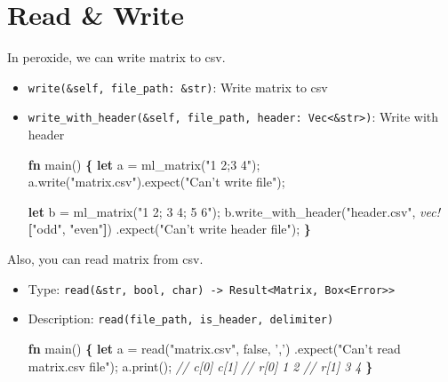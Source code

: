 \documentclass[]{book}
\newenvironment{Shaded}{\begin{snugshade}}{\end{snugshade}}
\newcommand{\CharTok}[1]{\textcolor[rgb]{0.31,0.60,0.02}{#1}}
\newcommand{\CommentTok}[1]{\textcolor[rgb]{0.56,0.35,0.01}{\textit{#1}}}
\newcommand{\ConstantTok}[1]{\textcolor[rgb]{0.00,0.00,0.00}{#1}}
\newcommand{\KeywordTok}[1]{\textcolor[rgb]{0.13,0.29,0.53}{\textbf{#1}}}
\newcommand{\NormalTok}[1]{#1}
\newcommand{\OperatorTok}[1]{\textcolor[rgb]{0.81,0.36,0.00}{\textbf{#1}}}
\newcommand{\PreprocessorTok}[1]{\textcolor[rgb]{0.56,0.35,0.01}{\textit{#1}}}
\newcommand{\StringTok}[1]{\textcolor[rgb]{0.31,0.60,0.02}{#1}}
\begin{document}
\hypertarget{read-write}{%
\section{Read \& Write}\label{read-write}}

In peroxide, we can write matrix to csv.

\begin{itemize}
\item
  \texttt{write(\&self,\ file\_path:\ \&str)}: Write matrix to csv
\item
  \texttt{write\_with\_header(\&self,\ file\_path,\ header:\ Vec\textless{}\&str\textgreater{})}: Write with header

\begin{Shaded}
\begin{Highlighting}[]
\KeywordTok{fn}\NormalTok{ main() }\OperatorTok{\{}
    \KeywordTok{let}\NormalTok{ a = ml_matrix(}\StringTok{"1 2;3 4"}\NormalTok{);}
\NormalTok{    a.write(}\StringTok{"matrix.csv"}\NormalTok{).expect(}\StringTok{"Can't write file"}\NormalTok{);}

    \KeywordTok{let}\NormalTok{ b = ml_matrix(}\StringTok{"1 2; 3 4; 5 6"}\NormalTok{);}
\NormalTok{    b.write_with_header(}\StringTok{"header.csv"}\NormalTok{, }\PreprocessorTok{vec!}\OperatorTok{[}\StringTok{"odd"}\NormalTok{, }\StringTok{"even"}\OperatorTok{]}\NormalTok{)}
\NormalTok{        .expect(}\StringTok{"Can't write header file"}\NormalTok{);}
\OperatorTok{\}}
\end{Highlighting}
\end{Shaded}
\end{itemize}

Also, you can read matrix from csv.

\begin{itemize}
\item
  Type: \texttt{read(\&str,\ bool,\ char)\ -\textgreater{}\ Result\textless{}Matrix,\ Box\textless{}Error\textgreater{}\textgreater{}}
\item
  Description: \texttt{read(file\_path,\ is\_header,\ delimiter)}

\begin{Shaded}
\begin{Highlighting}[]
\KeywordTok{fn}\NormalTok{ main() }\OperatorTok{\{}
    \KeywordTok{let}\NormalTok{ a = read(}\StringTok{"matrix.csv"}\NormalTok{, }\ConstantTok{false}\NormalTok{, }\CharTok{','}\NormalTok{)}
\NormalTok{        .expect(}\StringTok{"Can't read matrix.csv file"}\NormalTok{);}
\NormalTok{    a.print();}
    \CommentTok{//       c[0] c[1]}
    \CommentTok{// r[0]     1    2}
    \CommentTok{// r[1]     3    4}
\OperatorTok{\}}
\end{Highlighting}
\end{Shaded}
\end{itemize}
\end{document}
